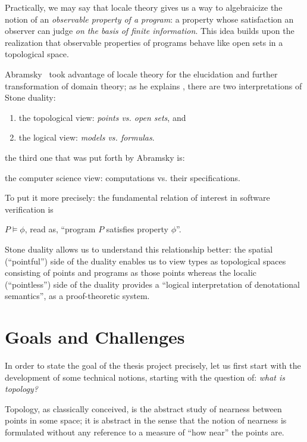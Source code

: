 \documentclass{article}
\begin{document}
Practically, we may say that locale theory gives us a way to algebraicize the notion of an
\emph{observable property of a program}: a property whose satisfaction an observer can
judge \emph{on the basis of finite information}. This idea builds upon the realization
that observable properties of programs behave like open sets in a topological space.

Abramsky~\cite{abramsky:1991} took advantage of locale theory for the elucidation and
further transformation of domain theory; as he explains \cite{abramsky:1991}, there are
two interpretations of Stone duality:
\begin{enumerate}
  \item the topological view: \emph{points vs. open sets}, and
  \item the logical view: \emph{models vs. formulas}.
\end{enumerate}
the third one that was put forth by Abramsky is:
\begin{center}
  the computer science view: computations vs. their specifications.
\end{center}

To put it more precisely: the fundamental relation of interest in software verification is

\begin{center}
  $P \vDash \phi$, \qquad read as, \qquad ``program $P$ satisfies property $\phi$''.
\end{center}

Stone duality allows us to understand this relationship better: the spatial (``pointful'')
side of the duality enables us to view types as topological spaces consisting of points
and programs as those points whereas the localic (``pointless'') side of the duality
provides a ``logical interpretation of denotational semantics'', as a proof-theoretic
system.

\section{Goals and Challenges}

In order to state the goal of the thesis project precisely, let us first start with the
development of some technical notions, starting with the question of: \emph{what is
  topology?}

Topology, as classically conceived, is the abstract study of nearness between points in
some space; it is abstract in the sense that the notion of nearness is formulated without
any reference to a measure of ``how near'' the points are.
\end{document}
